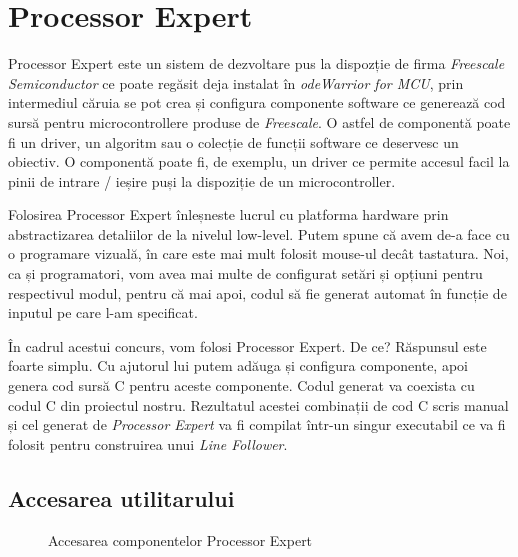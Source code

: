 \section{Processor Expert}

Processor Expert este un sistem de dezvoltare pus la dispozție de firma \textit{Freescale Semiconductor} ce poate regăsit deja instalat în \textit{odeWarrior for MCU}, prin intermediul căruia se pot crea și configura componente software ce generează cod sursă pentru microcontrollere produse de \textit{Freescale}. O astfel de componentă poate fi un driver, un algoritm sau o colecție de funcții software ce deservesc un obiectiv. O componentă poate fi, de exemplu, un driver ce permite accesul facil la pinii de intrare / ieșire puși la dispoziție de un microcontroller.

Folosirea Processor Expert înleșneste lucrul cu platforma hardware prin abstractizarea detaliilor de la nivelul low-level. Putem spune că avem de-a face cu o programare vizuală, în care este mai mult folosit mouse-ul decât tastatura. Noi, ca și programatori, vom avea mai multe de configurat setări și opțiuni pentru respectivul modul, pentru că mai apoi, codul să fie generat automat în funcție de inputul pe care l-am specificat. 

În cadrul acestui concurs, vom folosi Processor Expert. De ce? Răspunsul este foarte simplu. Cu ajutorul lui putem adăuga și configura componente, apoi genera cod sursă C pentru aceste componente. Codul generat va coexista cu codul C din proiectul nostru. Rezultatul acestei combinații de cod C scris manual și cel generat de \textit{Processor Expert} va fi compilat într-un singur executabil ce va fi folosit pentru construirea unui \textit{Line Follower}.

\subsection{Accesarea utilitarului}

\begin{figure}
  \vspace{-20pt}
  \vspace{-15pt}
  \caption{\label{fig:CodeWarrior-ProcessorExpert} Accesarea componentelor Processor Expert}
  \vspace{-20pt}
\end{figure}

